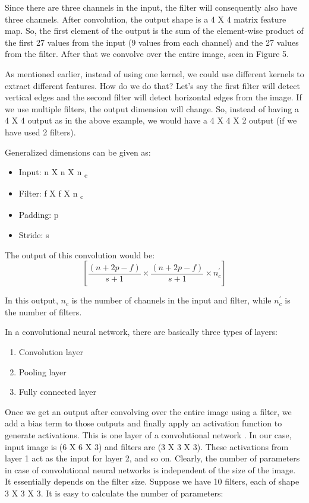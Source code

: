 Since there are three channels in the input, the filter will consequently also have three channels. After convolution, the output shape is a 4 X 4 matrix feature map. So, the first element of the output is the sum of the element-wise product of the first 27 values from the input (9 values from each channel) and the 27 values from the filter. After that we convolve over the entire image, seen in Figure 5.
\par
As mentioned earlier, instead of using one kernel, we could use different kernels to extract different features. How do we do that? Let’s say the first filter will detect vertical edges and the second filter will detect horizontal edges from the image. If we use multiple filters, the output dimension will change. So, instead of having a 4 X 4 output as in the above example, we would have a 4 X 4 X 2 output (if we have used 2 filters).
\par
Generalized dimensions can be given as:
\begin{itemize}
  \item Input: n X n X n \textsubscript{c}
  \item Filter: f X f X n \textsubscript{c}
  \item Padding: p
  \item Stride: s
\end{itemize}

The output of this convolution would be:
$$ [\frac{(n+2p-f)}{s+1} \times \frac{(n+2p-f)}{s+1} \times n_{c}^\prime] $$

In this output, $n_c$ is the number of channels in the input and filter, while $ n_c^\prime $ is the number of filters.

In a convolutional neural network, there are basically three types of layers:

\begin{enumerate}
  \item Convolution layer
  \item Pooling layer
  \item Fully connected layer
\end{enumerate}

Once we get an output after convolving over the entire image using a filter, we add a bias term to those outputs and finally apply an activation function to generate activations. This is one layer of a convolutional network . In our case, input image is (6 X 6 X 3) and filters are (3 X 3 X 3). These activations from layer 1 act as the input for layer 2, and so on. Clearly, the number of parameters in case of convolutional neural networks is independent of the size of the image. It essentially depends on the filter size. Suppose we have 10 filters, each of shape 3 X 3 X 3. It is easy to calculate the number of parameters:


